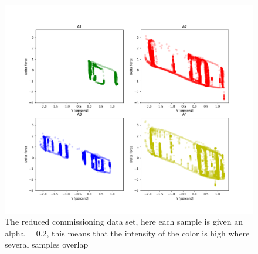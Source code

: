             \begin{figure}[h]
                \centering
                \includegraphics[width = \textwidth]{figures/data/start_up_reduced_4.png}
                \caption{The reduced commissioning data set, here each sample is given an alpha = 0.2, this means that the intensity of the color is high where several samples overlap}
                \label{fig:start_up_reduced_4}
            \end{figure}